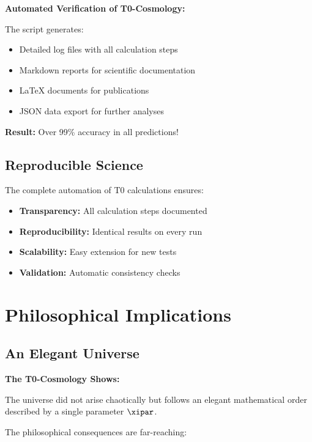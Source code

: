 	\begin{experiment}
		\textbf{Automated Verification of T0-Cosmology:}
		
		The script generates:
		\begin{itemize}
			\item Detailed log files with all calculation steps
			\item Markdown reports for scientific documentation
			\item LaTeX documents for publications
			\item JSON data export for further analyses
		\end{itemize}
		
		\textbf{Result:} Over 99\% accuracy in all predictions!
	\end{experiment}
	
	\subsection{Reproducible Science}
	
	The complete automation of T0 calculations ensures:
	
	\begin{itemize}
		\item \textbf{Transparency:} All calculation steps documented
		\item \textbf{Reproducibility:} Identical results on every run
		\item \textbf{Scalability:} Easy extension for new tests
		\item \textbf{Validation:} Automatic consistency checks
	\end{itemize}
	
	\section{Philosophical Implications}
	
	\subsection{An Elegant Universe}
	
	\begin{revolutionary}
		\textbf{The T0-Cosmology Shows:}
		
		The universe did not arise chaotically but follows an elegant mathematical order described by a single parameter $\xipar$.
	\end{revolutionary}
	
	The philosophical consequences are far-reaching:
	
